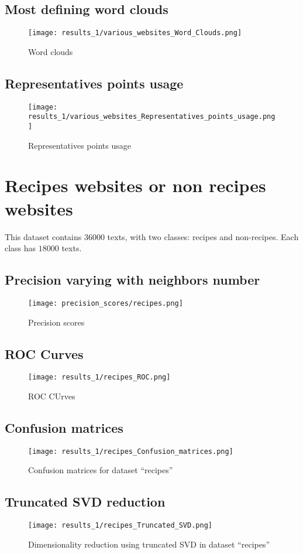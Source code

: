 \documentclass[\main/main.tex]{subfiles}
\begin{document}
\subsection{Most defining word clouds}
\begin{figure}
	\texttt{[image: results\_1/various\_websites\_Word\_Clouds.png]}
	\caption{Word clouds}
\end{figure}
\subsection{Representatives points usage}
\begin{figure}
	\texttt{[image: results\_1/various\_websites\_Representatives\_points\_usage.png]}
	\caption{Representatives points usage}
\end{figure}

\clearpage
\section{Recipes websites or non recipes websites}
This dataset contains \(36000\) texts, with two classes: recipes and non-recipes. Each class has \(18000\) texts.
\subsection{Precision varying with neighbors number}
\begin{figure}
	\texttt{[image: precision\_scores/recipes.png]}
	\caption{Precision scores}
\end{figure}
\subsection{ROC Curves}
\begin{figure}
	\texttt{[image: results\_1/recipes\_ROC.png]}
	\caption{ROC CUrves}
\end{figure}
\subsection{Confusion matrices}
\begin{figure}
	\texttt{[image: results\_1/recipes\_Confusion\_matrices.png]}
	\caption{Confusion matrices for dataset ``recipes''}
\end{figure}
\subsection{Truncated SVD reduction}
\begin{figure}
	\texttt{[image: results\_1/recipes\_Truncated\_SVD.png]}
	\caption{Dimensionality reduction using truncated SVD in dataset ``recipes''}
\end{figure}
\end{document}
